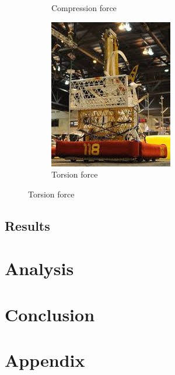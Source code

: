 \documentclass[12pt, letterpaper]{article}
\begin{document}
\begin{figure}[H]
\begin{subfigure}[t]{.3\linewidth}
		\caption{Compression force}
	\end{subfigure}
	\begin{subfigure}[t]{.3\linewidth}
		\includegraphics[width=\linewidth]{frc-ex2}
		\caption{Torsion force}
	\end{subfigure}
\end{figure}

\subsection{Results}
\label{sec:results}

\section{Analysis}
\label{sec:analysis}

\section{Conclusion}
\label{sec:conclusion}

\newpage
\printbibliography{}

\newpage
\section{Appendix}
\listoffigures{}
\end{document}
